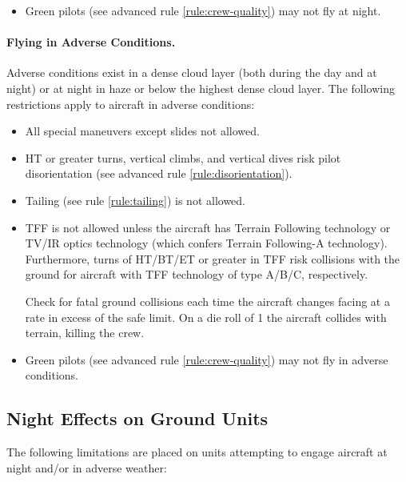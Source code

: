 \begin{advancedrules}
{\begin{itemize}
    \item{} Green pilots (see advanced rule \ref{rule:crew-quality}) may not fly at night.

\end{itemize}

\paragraph{Flying in Adverse Conditions.}

Adverse conditions exist in a dense cloud layer (both during the day and at night) or at night in haze or below the highest dense cloud layer. The following restrictions apply to aircraft in adverse conditions:

\begin{itemize}

    \item{} All special maneuvers except slides not allowed.

    \item{} HT or greater turns, vertical climbs, and vertical dives risk pilot disorientation (see advanced rule \ref{rule:disorientation}).

    \item{} Tailing (see rule \ref{rule:tailing}) is not allowed.

    \item{} TFF is not allowed unless the aircraft has Terrain Following technology or TV/IR optics technology (which confers Terrain Following-A technology). Furthermore, turns of HT/BT/ET or greater in TFF risk collisions with the ground for aircraft with TFF technology of type A/B/C, respectively.
    
    Check for fatal ground collisions each time the aircraft changes facing at a rate in excess of the safe limit. On a die roll of 1 the aircraft collides with terrain, killing the crew.

    \item{} Green pilots (see advanced rule \ref{rule:crew-quality}) may not fly in adverse conditions.

\end{itemize}

\subsection{Night Effects on Ground Units} The following limitations are placed on units attempting to engage aircraft at night and/or in adverse weather:

}
\end{advancedrules}
